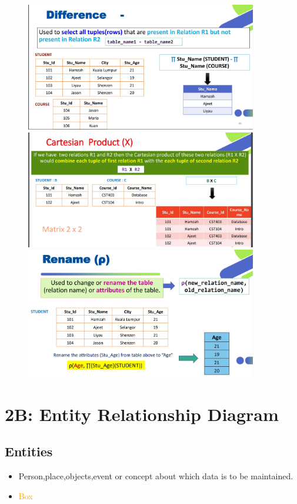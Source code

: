 \documentclass[a4paper, 12pt]{article}
\begin{document}
    \begin{figure}[H]
        \includegraphics[width=0.9\textwidth]{chapter1a_12.png}
        \includegraphics[width=0.9\textwidth]{chapter1a_13.png}
        \includegraphics[width=0.9\textwidth]{chapter1a_14.png}
    \end{figure}
    \newpage
\section{2B: Entity Relationship Diagram}
    \subsection{Entities}
        \begin{itemize}
            \item Person,place,objects,event or concept about which data is to be maintained.
            \item \textcolor{orange}{Box}
        \end{itemize}
\end{document}
